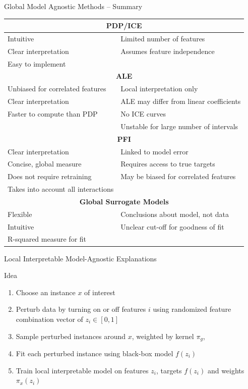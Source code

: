 \documentclass[ignorenonframetext,xcolor=x11names]{beamer}
\begin{document}
\begin{frame}[label=full]{Global Model Agnostic Methods -- Summary}
\footnotesize
\renewcommand{\arraystretch}{1.1}
\begin{tabular}{l|l} \hline
\multicolumn{2}{c}{\textbf{PDP/ICE}} \\ \hline
Intuitive & Limited number of features \\
Clear interpretation & Assumes feature independence \\
Easy to implement & \\ \hline
\multicolumn{2}{c}{\textbf{ALE}} \\ \hline
Unbiased for correlated features & Local interpretation only\\
Clear interpretation & ALE may differ from linear coefficients\\ 
Faster to compute than PDP & No ICE curves \\
& Unstable for large number of intervals \\  \hline
\multicolumn{2}{c}{\textbf{PFI}} \\ \hline
Clear interpretation & Linked to model error \\
Concise, global measure & Requires access to true targets \\
Does not require retraining & May be biased for correlated features \\
Takes into account all interactions & \\ \hline
\multicolumn{2}{c}{\textbf{Global Surrogate Models}} \\ \hline
Flexible & Conclusions about model, not data \\ 
Intuitive & Unclear cut-off for goodness of fit \\
R-squared measure for fit & \\ \hline
\end{tabular}
\end{frame}

\begin{frame}[label=full]{Local Interpretable Model-Agnostic Explanations}
\small
\begin{block}{Idea}
\begin{enumerate}
   \item Choose an instance $x$ of interest
   \item Perturb data by turning on or off features $i$ using randomized feature combination vector of $z_i \in [0, 1]$
   \item Sample perturbed instances around $x$, weighted by kernel $\pi_g$,
   \item Fit each perturbed instance using black-box model $f(z_i)$
   \item Train local interpretable model on features $z_i$, targets $f(z_i)$ and weights $\pi_x(z_i)$
\end{enumerate}
\end{block}

\end{frame}
\end{document}
